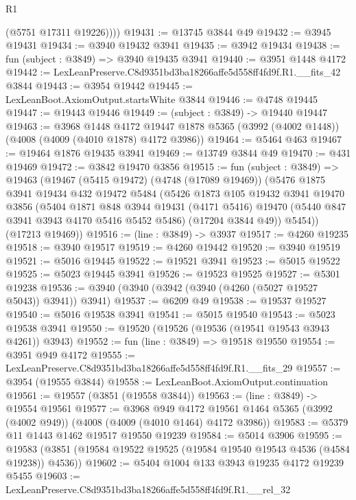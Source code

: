 \begin{lexlean}{R1}
\begin{coremodule}
          (@5751 @17311 @19226))))
@19431 := @13745 @3844 @49
@19432 := @3945 @19431
@19434 := @3940 @19432 @3941
@19435 := @3942 @19434
@19438 := fun (subject : @3849) => @3940 @19435 @3941
@19440 := @3951 @1448 @4172
@19442 := LexLeanPreserve.C8d9351bd3ba18266affe5d558ff4fd9f.R1.__fits_42 @3844
@19443 := @3954 @19442
@19445 := LexLeanBoot.AxiomOutput.startsWhite @3844
@19446 := @4748 @19445
@19447 := @19443 @19446
@19449 := (subject : @3849) -> @19440 @19447
@19463 := @3968
    @1448
    @4172
    @19447
    @1878
    @5365
    (@3992 (@4002 @1448))
    (@4008 (@4009 (@4010 @1878) @4172 @3986))
@19464 := @5464 @463
@19467 := @19464 @1876 @19435 @3941
@19469 := @13749 @3844 @49
@19470 := @431 @19469
@19472 := @3842 @19470 @3856
@19515 := fun (subject : @3849) =>
  @19463
    (@19467
      (@5415 @19472)
      (@4748 (@17089 @19469))
      (@5476
        @1875
        @3941
        @19434
        @432
        @19472
        @5484
        (@5426
          @1873
          @105
          @19432
          @3941
          @19470
          @3856
          (@5404
            @1871
            @848
            @3944
            @19431
            (@4171 @5416)
            @19470
            (@5440 @847 @3941 @3943 @4170 @5416 @5452 @5486)
            (@17204 @3844 @49))
          @5454))
      (@17213 @19469))
@19516 := (line : @3849) -> @3937
@19517 := @4260 @19235
@19518 := @3940 @19517
@19519 := @4260 @19442
@19520 := @3940 @19519
@19521 := @5016 @19445
@19522 := @19521 @3941
@19523 := @5015 @19522
@19525 := @5023 @19445 @3941
@19526 := @19523 @19525
@19527 := @5301 @19238
@19536 := @3940 (@3940 (@3942 (@3940 (@4260 (@5027 @19527 @5043)) @3941)) @3941)
@19537 := @6209 @49
@19538 := @19537 @19527
@19540 := @5016 @19538 @3941
@19541 := @5015 @19540
@19543 := @5023 @19538 @3941
@19550 := @19520 (@19526 (@19536 (@19541 @19543 @3943 @4261)) @3943)
@19552 := fun (line : @3849) => @19518 @19550
@19554 := @3951 @949 @4172
@19555 := LexLeanPreserve.C8d9351bd3ba18266affe5d558ff4fd9f.R1.__fits_29
@19557 := @3954 (@19555 @3844)
@19558 := LexLeanBoot.AxiomOutput.continuation
@19561 := @19557 (@3851 (@19558 @3844))
@19563 := (line : @3849) -> @19554 @19561
@19577 := @3968
    @949
    @4172
    @19561
    @1464
    @5365
    (@3992 (@4002 @949))
    (@4008 (@4009 (@4010 @1464) @4172 @3986))
@19583 := @5379 @11 @1443 @1462 @19517 @19550 @19239
@19584 := @5014 @3906
@19595 := @19583 (@3851 (@19584 @19522 @19525 (@19584 @19540 @19543 @4536 (@4584 @19238)) @4536))
@19602 := @5404 @1004 @133 @3943 @19235 @4172 @19239 @5455
@19603 := LexLeanPreserve.C8d9351bd3ba18266affe5d558ff4fd9f.R1.__rel_32

\end{coremodule}
\end{lexlean}
